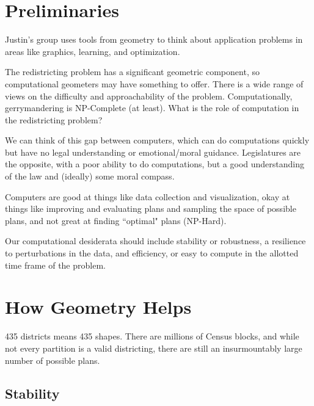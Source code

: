 


\section*{Preliminaries}

Justin's group uses tools from geometry to think about application problems in areas like graphics, learning, and optimization.  

The redistricting problem has a significant geometric component, so computational geometers may have something to offer.  There is a wide range of views on the difficulty and approachability of the problem.  Computationally, gerrymandering is NP-Complete (at least).  What is the role of computation in the redistricting problem?


We can think of this gap between computers, which can do computations quickly but have no legal understanding or emotional/moral guidance.  Legislatures are the opposite, with a poor ability to do computations, but a good understanding of the law and (ideally) some moral compass.  

Computers are good at things like data collection and visualization, okay at things like improving and evaluating plans and sampling the space of possible plans, and not great at finding ``optimal" plans (NP-Hard).

Our computational desiderata should include stability or robustness, a resilience to perturbations in the data, and efficiency, or easy to compute in the allotted time frame of the problem.

\section*{How Geometry Helps}

435 districts means 435 shapes.  There are millions of Census blocks, and while not every partition is a valid districting, there are still an insurmountably large number of possible plans.

\subsection*{Stability}


